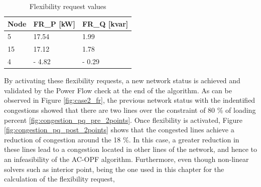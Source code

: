 \begin{table}[htbp]
\centering
\caption{Flexibility request values}
\label{tab:FR_case2}
\begin{tabular}{lll} 
\toprule
Node & FR\_P [kW] & FR\_Q [kvar]  \\ 
\hline
5    & 17.54      & 1.99         \\
15    & 17.12      & 1.78          \\
4    & - 4.82      & - 0.29         \\
\bottomrule
\end{tabular}
\end{table}

By activating these flexibility requests, a new network status is achieved and validated by the Power Flow check at the end of the algorithm. As can be observed in Figure \ref{fig:case2_fr}, the previous network status with the indentified congestions showed that there are two lines over the constraint of 80 \% of loading percent \ref{fig:congestion_pq_pre_2points}. Once flexibility is activated, Figure \ref{fig:congestion_pq_post_2points} shows that the congested lines achieve a reduction of congestion around the 18 \%. In this case, a greater reduction in these lines lead to a congestion located in other lines of the network, and hence to an infeasibility of the AC-OPF algorithm. Furthermore, even though non-linear solvers such as interior point, being the one used in this chapter for the calculation of the flexibility request, 

